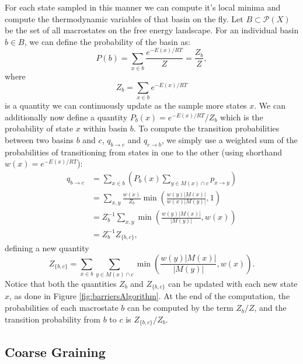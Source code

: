 For each state sampled in this manner we can compute it's local minima
and compute the thermodynamic variables of that basin on the fly. Let
$B \subset \mathcal{P}(X)$ be the set of all macrostates on the free
energy landscape. For an individual basin $b \in B$, we can define the
probability of the basin as:
\begin{equation}
P(b) = \sum_{x \in b} \frac{e^{-E(x)/RT}}{Z} = \frac{Z_b}{Z}, 
\end{equation}
where
\begin{equation}
Z_b = \sum_{x \in b} e^{-E(x)/RT}
\label{eq:Zb}
\end{equation}
is a quantity we can continuously update as the sample more states
$x$. We can additionally now define a quantity
$P_b(x)=e^{-E(x)/RT}/Z_b$ which is the probability of state $x$ within
basin $b$.
To compute the transition probabilities between two basins $b$ and $c$,
$q_{b \to c}$ and $q_{c \to b}$, we simply use a weighted sum of the
probabilities of transitioning from states in one to the other (using
shorthand $w(x)=e^{-E(x)/RT}$):
\begin{equation}
\begin{split} 
q_{b \to c} &= \sum_{x \in b} \left ( P_b(x) \sum_{y \in M(x) \cap c} p_{x \to y} \right ) 
\\ & = \sum_{x,y} \frac{w(x)}{Z_b} \min \left (\frac{ w(y)  | M(x) |}{ w(x)  | M(y) |} , 1 \right )
\\ & = Z_b ^{-1}\sum_{x,y}  \min \left (\frac{ w(y)  | M(x) |}{| M(y) |} , w(x) \right )
\\ & = Z_b^{-1} Z_{\{b, c\}},
\end{split}
\end{equation}
defining a new quantity
\begin{equation}
Z_{\{b, c\}} = \sum_{x \in b} \sum_{y \in M(x) \cap c} \min \left ( \frac{w(y) |M(x)|}{|M(y)|}, w(x) \right ). 
\label{eq:Zbc} 
\end{equation}
Notice that both the quantities $Z_b$ and $Z_{\{b, c\}}$ can be
updated with each new state $x$, as done in Figure
\ref{fig:barriersAlgorithm}. At the end of the computation, the
probabilities of each macrostate $b$ can be computed by the term
$Z_b/Z$, and the transition probability from $b$ to $c$ is
$Z_{\{b,c\}}/Z_b$. 

\subsection{Coarse Graining}

